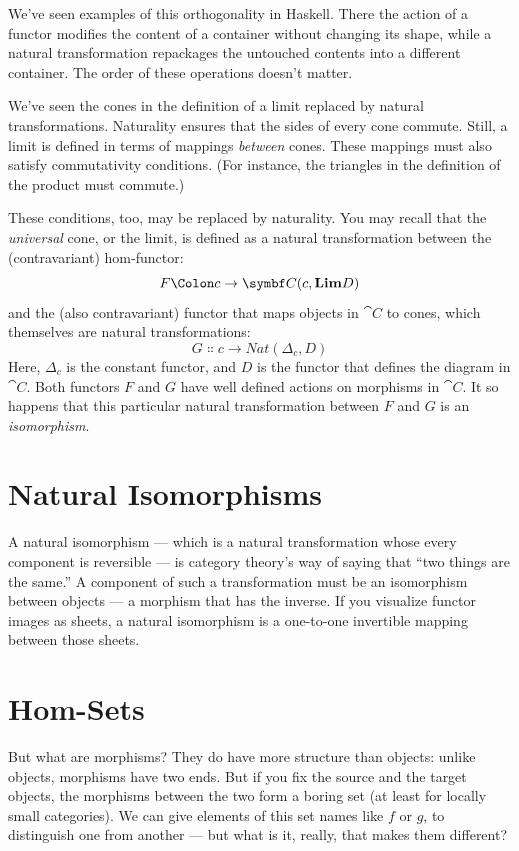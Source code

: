 \noindent
We've seen examples of this orthogonality in Haskell. There the action
of a functor modifies the content of a container without changing its
shape, while a natural transformation repackages the untouched contents
into a different container. The order of these operations doesn't
matter.

We've seen the cones in the definition of a limit replaced by natural
transformations. Naturality ensures that the sides of every cone
commute. Still, a limit is defined in terms of mappings \emph{between}
cones. These mappings must also satisfy commutativity conditions. (For
instance, the triangles in the definition of the product must commute.)

These conditions, too, may be replaced by naturality. You may recall
that the \emph{universal} cone, or the limit, is defined as a natural
transformation between the (contravariant) hom-functor:
\[F \Colon c \to \cat{C}(c, \Lim[D])\]
and the (also contravariant) functor that maps objects in $\cat{C}$ to
cones, which themselves are natural transformations:
\[G \Colon c \to \mathit{Nat}(\Delta_c, D)\]
Here, $\Delta_c$ is the constant functor, and $D$ is the functor
that defines the diagram in $\cat{C}$. Both functors $F$ and
$G$ have well defined actions on morphisms in $\cat{C}$. It so
happens that this particular natural transformation between $F$
and $G$ is an \emph{isomorphism}.

\section{Natural Isomorphisms}

A natural isomorphism --- which is a natural transformation whose every
component is reversible --- is category theory's way of saying that
``two things are the same.'' A component of such a transformation must
be an isomorphism between objects --- a morphism that has the inverse.
If you visualize functor images as sheets, a natural isomorphism is a
one-to-one invertible mapping between those sheets.

\section{Hom-Sets}

But what are morphisms? They do have more structure than objects: unlike
objects, morphisms have two ends. But if you fix the source and the
target objects, the morphisms between the two form a boring set (at
least for locally small categories). We can give elements of this set
names like $f$ or $g$, to distinguish one from another ---
but what is it, really, that makes them different?

